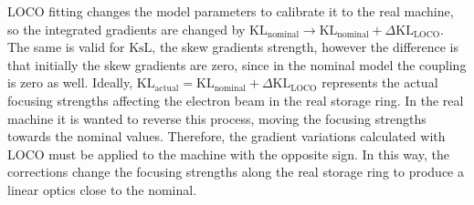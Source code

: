 LOCO fitting changes the model parameters to calibrate it to the real machine, so the integrated gradients are changed by $\mathrm{KL}_{\mathrm{nominal}} \rightarrow \mathrm{KL}_{\mathrm{nominal}} + \Delta\mathrm{KL}_{\mathrm{LOCO}}$. The same is valid for $\mathrm{KsL}$, the skew gradients strength, however the difference is that initially the skew gradients are zero, since in the nominal model the coupling is zero as well. Ideally, $\mathrm{KL}_{\mathrm{actual}} = \mathrm{KL}_{\mathrm{nominal}} + \Delta\mathrm{KL}_{\mathrm{LOCO}}$ represents the actual focusing strengths affecting the electron beam in the real storage ring. In the real machine it is wanted to reverse this process, moving the focusing strengths towards the nominal values. Therefore, the gradient variations calculated with LOCO must be applied to the machine with the opposite sign. In this way, the corrections change the focusing strengths along the real storage ring to produce a linear optics close to the nominal.

